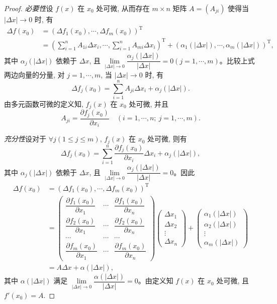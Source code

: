 \begin{proof}
\emph{必要性}\quad 设 $f(x)$ 在 $x_0$ 处可微, 从而存在 $m\times n$ 矩阵 $A=(A_{ji})$ 使得当 $|\Delta x|\to0$ 时, 有
\[
\begin{aligned}
  \Delta f(x_0)
  &=(\Delta f_1(x_0),\cdots,\Delta f_m(x_0))^\mathrm T\\
  &=\left(\sum_{i=1}^n A_{1i}\Delta x_i,\cdots,\sum_{i=1}^n A_{mi}\Delta x_i\right)^\mathrm T
  +(\alpha_1(|\Delta x|),\cdots,\alpha_m(|\Delta x|))^\mathrm T,
\end{aligned}
\]
其中 $\alpha_j(|\Delta x|)$ 依赖于 $\Delta x$, 且 $\lim\limits_{|\Delta x|\to0}\dfrac{\alpha_j(|\Delta x|)}{|\Delta x|}=0(j=1,\cdots,m)$。比较上式两边向量的分量, 对 $j=1,\cdots,m$, 当 $|\Delta x|\to0$ 时, 有
\[
  \Delta f_j(x_0)=\sum_{i=1}^n A_{ji}\Delta x_i+\alpha_j(|\Delta x|).
\]
由多元函数可微的定义知, $f_j(x)$ 在 $x_0$ 处可微, 并且
\[
  A_{ji}=\frac{\partial f_j(x_0)}{\partial x_i}
  \quad (i=1,\cdots,n;\ j=1,\cdots,m).
\]

\emph{充分性}\quad 设对于 $\forall j(1\leqslant j\leqslant m)$, $f_j(x)$ 在 $x_0$ 处可微, 则有
\[
  \Delta f_j(x_0)=\sum_{i=1}^n\frac{\partial f_j(x_0)}{\partial x_i}\Delta x_i+\alpha_j(|\Delta x|),
\]
其中 $\alpha_j(|\Delta x|)$ 依赖于 $\Delta x$, 且 $\lim\limits_{|\Delta x|\to0}\dfrac{\alpha_j(|\Delta x|)}{|\Delta x|}=0$。因此
\[
\begin{aligned}
  \Delta f(x_0)
  &=(\Delta f_1(x_0),\cdots,\Delta f_m(x_0))^\mathrm T\\
  &=
  \begin{pmatrix}
    \dfrac{\partial f_1(x_0)}{\partial x_1}&\cdots&\dfrac{\partial f_1(x_0)}{\partial x_n}\\
    \dfrac{\partial f_2(x_0)}{\partial x_1}&\cdots&\dfrac{\partial f_2(x_0)}{\partial x_n}\\
    \cdots&\cdots&\cdots\\
    \dfrac{\partial f_m(x_0)}{\partial x_1}&\cdots&\dfrac{\partial f_m(x_0)}{\partial x_n}
  \end{pmatrix}
  \begin{pmatrix}
    \Delta x_1\\
    \Delta x_2\\
    \vdots\\
    \Delta x_n
  \end{pmatrix}
  +
  \begin{pmatrix}
    \alpha_1(|\Delta x|)\\
    \alpha_2(|\Delta x|)\\
    \vdots\\
    \alpha_m(|\Delta x|)
  \end{pmatrix}\\
  &=A\Delta x+\alpha(|\Delta x|),
\end{aligned}
\]
其中 $\alpha(|\Delta x|)$ 满足 $\lim\limits_{|\Delta x|\to0}\dfrac{\alpha(|\Delta x|)}{|\Delta x|}=0$。由定义知 $f(x)$ 在 $x_0$ 处可微, 且 $f'(x_0)=A$.
\end{proof}


